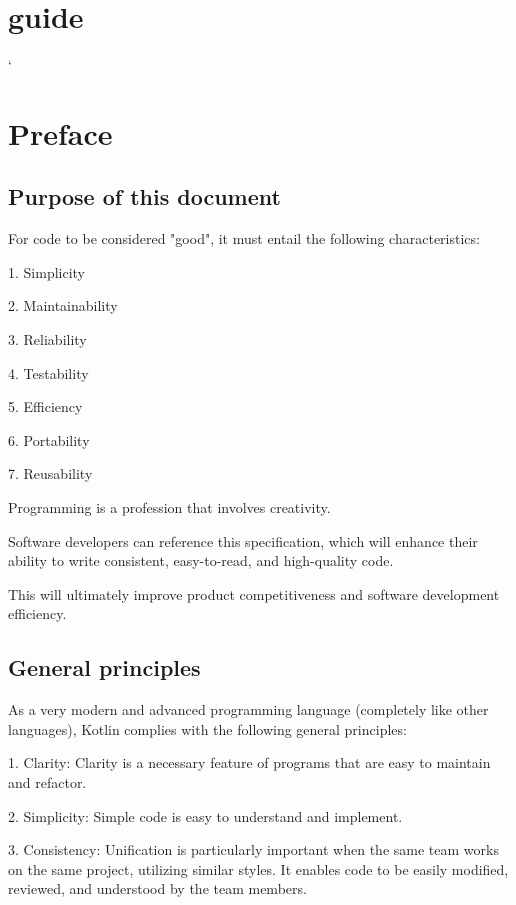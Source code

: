 \section*{guide}

\lstMakeShortInline[basicstyle=\ttfamily\bfseries]`

\section*{\textbf{Preface}}

\subsection*{\textbf{Purpose of this document}}



For code to be considered "good", it must entail the following characteristics:

1.	Simplicity

2.	Maintainability

3.	Reliability

4.	Testability

5.	Efficiency

6.	Portability

7.	Reusability



Programming is a profession that involves creativity.

Software developers can reference this specification, which will enhance their ability to write consistent, easy-to-read, and high-quality code.

This will ultimately improve product competitiveness and software development efficiency.



\subsection*{\textbf{General principles}}



As a very modern and advanced programming language (completely like other languages), Kotlin complies with the following general principles:

1.	Clarity: Clarity is a necessary feature of programs that are easy to maintain and refactor.

2.	Simplicity: Simple code is easy to understand and implement.

3.	Consistency: Unification is particularly important when the same team works on the same project, utilizing similar styles. It enables code to be easily modified, reviewed, and understood by the team members.



